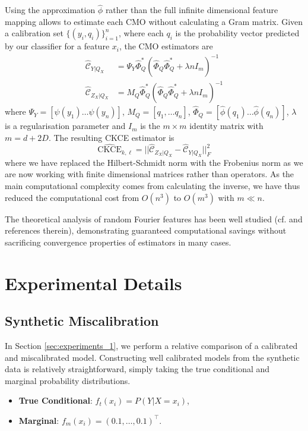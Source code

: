 \documentclass[twocolumn]{article}
\theoremstyle{definition}
\begin{document}
Using the approximation $\hat \phi$ rather than the full infinite dimensional feature mapping allows to estimate each CMO without calculating a Gram matrix. Given a calibration set $\{(y_i , q_i)\}_{i=1}^n$, where each $q_i$ is the probability vector predicted by our classifier for a feature $x_i$, the CMO estimators are
\begin{align*}
    \widehat{\mathcal C}_{Y | Q_X} &= \Psi_Y \widehat\Phi_Q^* (\widehat\Phi_Q \widehat\Phi_Q^* + \lambda n I_m)^{-1} \\
    \widehat{\mathcal C}_{Z_X | Q_X} &= M_Q \widehat\Phi_Q^* (\widehat\Phi_Q \widehat\Phi_Q^* + \lambda n I_m)^{-1} 
\end{align*}
where $\Psi_Y = [\psi(y_1) \dots \psi(y_n)]$, $M_Q = [q_1, \dots q_n]$, $\widehat \Phi_Q = [\hat\phi(q_1) \dots \hat\phi(q_n)]$, $\lambda$ is a regularisation parameter and $I_m$ is the $m\times m$ identity matrix with $m = d+2D$. The resulting CKCE estimator is
\begin{equation*}
    \widehat{\text{CKCE}}_{k, \ell} = ||\widehat{\mathcal C}_{Z_X | Q_X} - \widehat{\mathcal C}_{Y | Q_X}||_F^2
\end{equation*}
where we have replaced the Hilbert-Schmidt norm with the Frobenius norm as we are now working with finite dimensional matrices rather than operators. As the main computational complexity comes from calculating the inverse, we have thus reduced the computational cost from $O(n^3)$ to $O(m^3)$ with $m \ll n$. 

The theoretical analysis of random Fourier features has been well studied (cf. \citet{liUnifiedAnalysisRandom2021} and references therein), demonstrating guaranteed computational savings without sacrificing convergence properties of estimators in many cases. 


\section{Experimental Details}

\subsection{Synthetic Miscalibration} \label{Ap:ts}

In Section \ref{sec:experiments_1}, we perform a relative comparison of a calibrated and miscalibrated model. Constructing well calibrated models from the synthetic data is relatively straightforward, simply taking the true conditional and marginal probability distributions. 
\begin{itemize}
    \item \textbf{True Conditional}: $f_t(x_i) = P(Y|X = x_i)$,
    \item \textbf{Marginal}: $f_m(x_i) = (0.1, \dots, 0.1)^\top$.
\end{itemize}
\end{document}
